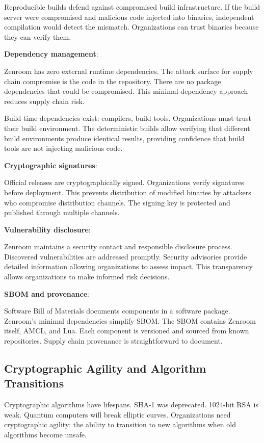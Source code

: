 Reproducible builds defend against compromised build
infrastructure. If the build server were compromised and malicious
code injected into binaries, independent compilation would detect the
mismatch. Organizations can trust binaries because they can verify
them.

\textbf{Dependency management}:

Zenroom has zero external runtime dependencies. The attack surface for
supply chain compromise is the code in the repository. There are no
package dependencies that could be compromised. This minimal
dependency approach reduces supply chain risk.

Build-time dependencies exist: compilers, build tools. Organizations
must trust their build environment. The deterministic builds allow
verifying that different build environments produce identical results,
providing confidence that build tools are not injecting malicious
code.

\textbf{Cryptographic signatures}:

Official releases are cryptographically signed. Organizations verify
signatures before deployment. This prevents distribution of modified
binaries by attackers who compromise distribution channels. The
signing key is protected and published through multiple channels.

\textbf{Vulnerability disclosure}:

Zenroom maintains a security contact and responsible disclosure
process. Discovered vulnerabilities are addressed promptly. Security
advisories provide detailed information allowing organizations to
assess impact. This transparency allows organizations to make informed
risk decisions.

\textbf{SBOM and provenance}:

Software Bill of Materials documents components in a software
package. Zenroom's minimal dependencies simplify SBOM. The SBOM
contains Zenroom itself, AMCL, and Lua. Each component is versioned
and sourced from known repositories. Supply chain provenance is
straightforward to document.

\subsection{Cryptographic Agility and Algorithm Transitions}

Cryptographic algorithms have lifespans. SHA-1 was
deprecated. 1024-bit RSA is weak. Quantum computers will break
elliptic curves. Organizations need cryptographic agility: the ability
to transition to new algorithms when old algorithms become unsafe.

